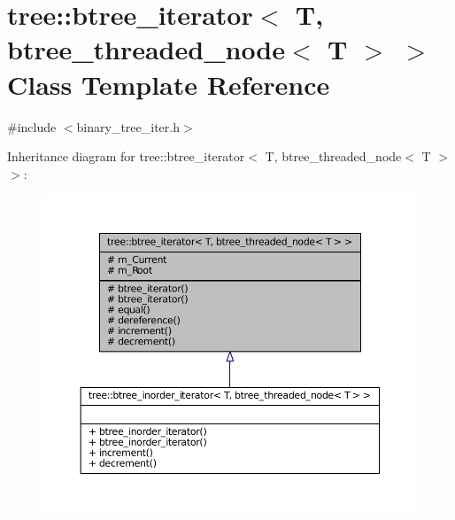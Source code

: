 \hypertarget{classtree_1_1btree__iterator_3_01T_00_01btree__threaded__node_3_01T_01_4_01_4}{\section{tree\-:\-:btree\-\_\-iterator$<$ \-T, btree\-\_\-threaded\-\_\-node$<$ \-T $>$ $>$ \-Class \-Template \-Reference}
\label{classtree_1_1btree__iterator_3_01T_00_01btree__threaded__node_3_01T_01_4_01_4}
}


{\ttfamily \#include $<$binary\-\_\-tree\-\_\-iter.\-h$>$}



\-Inheritance diagram for tree\-:\-:btree\-\_\-iterator$<$ \-T, btree\-\_\-threaded\-\_\-node$<$ \-T $>$ $>$\-:
\nopagebreak
\begin{figure}[H]
\begin{center}
\leavevmode
\includegraphics[width=350pt]{classtree_1_1btree__iterator_3_01T_00_01btree__threaded__node_3_01T_01_4_01_4__inherit__graph}
\end{center}
\end{figure}


